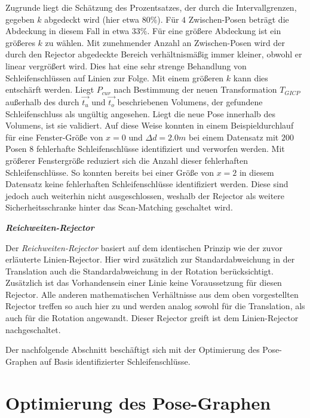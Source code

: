 Zugrunde liegt die Schätzung des Prozentsatzes, der durch die Intervallgrenzen, gegeben $k$ abgedeckt wird (hier etwa $80\%$). Für $4$ Zwischen-Posen beträgt die Abdeckung in diesem Fall in etwa $33\%$. Für eine größere Abdeckung ist ein größeres $k$ zu wählen. Mit zunehmender Anzahl an Zwischen-Posen wird der durch den Rejector abgedeckte Bereich verhältnismäßig immer kleiner, obwohl er linear vergrößert wird. Dies hat eine sehr strenge Behandlung von Schleifenschlüssen auf Linien zur Folge. Mit einem größeren $k$ kann dies entschärft werden. Liegt $P_{cur}$ nach Bestimmung der neuen Transformation $T_{GICP}$ außerhalb des durch $\vec{t_u}$ und $\vec{t_o}$ beschriebenen Volumens, der gefundene Schleifenschluss als ungültig angesehen. Liegt die neue Pose innerhalb des Volumens, ist sie validiert. Auf diese Weise konnten in einem Beispieldurchlauf für eine Fenster-Größe von $x = 0$ und $\Delta d = 2.0m$ bei einem Datensatz mit $200$ Posen $8$ fehlerhafte Schleifenschlüsse identifiziert und verworfen werden. Mit größerer Fenstergröße reduziert sich die Anzahl dieser fehlerhaften Schleifenschlüsse. So konnten bereits bei einer Größe von $x = 2$ in diesem Datensatz keine fehlerhaften Schleifenschlüsse identifiziert werden. Diese sind jedoch auch weiterhin nicht ausgeschlossen, weshalb der Rejector als weitere Sicherheitsschranke hinter das Scan-Matching geschaltet wird.

\textbf{\textsl{Reichweiten-Rejector}}

Der \emph{Reichweiten-Rejector} basiert auf dem identischen Prinzip wie der zuvor erläuterte Linien-Rejector. Hier wird zusätzlich zur Standardabweichung in der Translation auch die Standardabweichung in der Rotation berücksichtigt. Zusätzlich ist das Vorhandensein einer Linie keine Voraussetzung für diesen Rejector. Alle anderen mathematischen Verhältnisse aus dem oben vorgestellten Rejector treffen so auch hier zu und werden analog sowohl für die Translation, als auch für die Rotation angewandt.  Dieser Rejector greift ist dem Linien-Rejector nachgeschaltet.

Der nachfolgende Abschnitt beschäftigt sich mit der Optimierung des Pose-Graphen auf Basis identifizierter Schleifenschlüsse.

\section{Optimierung des Pose-Graphen}

